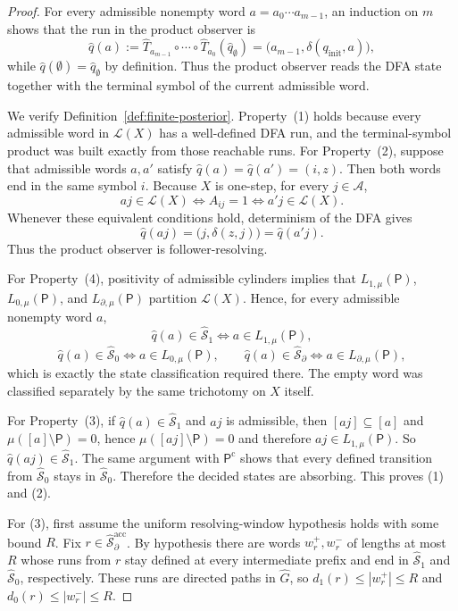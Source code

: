 \documentclass{etds}%
\numberwithin{equation}{section}
\theoremstyle{plain}
\theoremstyle{definition}
\theoremstyle{remark}
\begin{document}
\begin{proof}
For every admissible nonempty word $a=a_0\cdots a_{m-1}$, an induction on $m$
shows that the run in the product observer is
\[
\widehat q(a)
:=\widehat T_{a_{m-1}}\circ\cdots\circ \widehat T_{a_0}(\widehat q_\emptyset)
=\bigl(a_{m-1},\delta(q_{\mathrm{init}},a)\bigr),
\]
while $\widehat q(\emptyset)=\widehat q_\emptyset$ by definition.  Thus the
product observer reads the DFA state together with the terminal symbol of the
current admissible word.

We verify Definition~\ref{def:finite-posterior}.  Property~(1) holds because
every admissible word in $\mathcal{L}(X)$ has a well-defined DFA run, and the
terminal-symbol product was built exactly from those reachable runs.  For
Property~(2), suppose that admissible words $a,a'$ satisfy
$\widehat q(a)=\widehat q(a')=(i,z)$.  Then both words end in the same symbol
$i$.  Because $X$ is one-step, for every $j\in\mathcal{A}$,
\[
aj\in\mathcal{L}(X)\Longleftrightarrow A_{ij}=1
\Longleftrightarrow a'j\in\mathcal{L}(X).
\]
Whenever these equivalent conditions hold, determinism of the DFA gives
\[
\widehat q(aj)
=\bigl(j,\delta(z,j)\bigr)
=\widehat q(a'j).
\]
Thus the product observer is follower-resolving.

For Property~(4), positivity of admissible cylinders implies that
$L_{1,\mu}(\mathsf{P})$, $L_{0,\mu}(\mathsf{P})$, and
$L_{\partial,\mu}(\mathsf{P})$ partition $\mathcal{L}(X)$.  Hence, for every
admissible nonempty word $a$,
\[
\widehat q(a)\in \widehat{\mathcal{S}}_1
\Longleftrightarrow a\in L_{1,\mu}(\mathsf{P}),
\]
\[
\widehat q(a)\in \widehat{\mathcal{S}}_0
\Longleftrightarrow a\in L_{0,\mu}(\mathsf{P}),
\qquad
\widehat q(a)\in \widehat{\mathcal{S}}_\partial
\Longleftrightarrow a\in L_{\partial,\mu}(\mathsf{P}),
\]
which is exactly the state classification required there.  The empty word was
classified separately by the same trichotomy on $X$ itself.

For Property~(3), if $\widehat q(a)\in \widehat{\mathcal{S}}_1$ and $aj$ is
admissible, then $[aj]\subseteq[a]$ and $\mu([a]\setminus\mathsf{P})=0$, hence
$\mu([aj]\setminus\mathsf{P})=0$ and therefore
$aj\in L_{1,\mu}(\mathsf{P})$.  So $\widehat q(aj)\in \widehat{\mathcal{S}}_1$.
The same argument with $\mathsf{P}^{\mathrm c}$ shows that every defined
transition from $\widehat{\mathcal{S}}_0$ stays in
$\widehat{\mathcal{S}}_0$.  Therefore the decided states are absorbing.  This
proves (1) and (2).

For (3), first assume the uniform resolving-window hypothesis holds with some
bound $R$.  Fix $r\in\widehat{\mathcal{S}}_\partial^{\mathrm{acc}}$.  By hypothesis there are
words $w_r^+,w_r^-$ of lengths at most $R$ whose runs from $r$ stay defined at
every intermediate prefix and end in $\widehat{\mathcal{S}}_1$ and
$\widehat{\mathcal{S}}_0$, respectively.  These runs are directed paths in
$\widehat G$, so
$d_1(r)\le |w_r^+|\le R$ and $d_0(r)\le |w_r^-|\le R$.


\end{proof}
\end{document}
